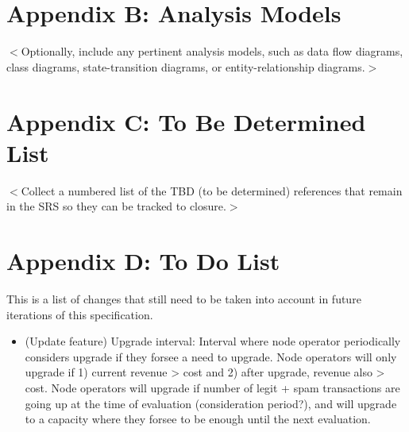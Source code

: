 \documentclass{scrreprt}
\begin{document}
\section{Appendix B: Analysis Models}
$<$Optionally, include any pertinent analysis models, such as data flow
diagrams, class diagrams, state-transition diagrams, or entity-relationship
diagrams.$>$

\section{Appendix C: To Be Determined List}
$<$Collect a numbered list of the TBD (to be determined) references that remain
in the SRS so they can be tracked to closure.$>$

\section{Appendix D: To Do List}
This is a list of changes that still need to be taken into account in
future iterations of this specification.

\begin{itemize}
   \item (Update feature) Upgrade interval: Interval where node operator periodically considers upgrade if they forsee a need to upgrade. Node operators will only upgrade if 1) current revenue > cost and 2) after upgrade, revenue also > cost. Node operators will upgrade if number of legit + spam transactions are going up at the time of evaluation (consideration period?), and will upgrade to a capacity where they forsee to be enough until the next evaluation.
\end{itemize}
\end{document}
